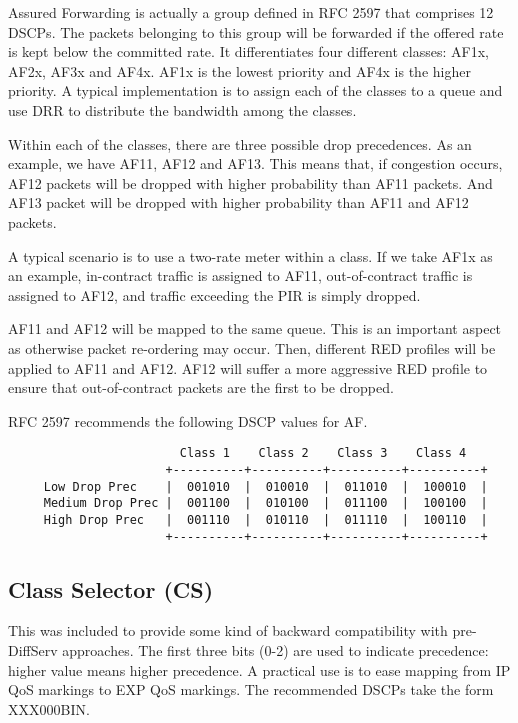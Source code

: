 Assured Forwarding is actually a group defined in RFC 2597 \cite{rfc2597} that comprises 12 DSCPs.
The packets belonging to this group will be forwarded if the offered rate is kept below the committed rate.
It differentiates four different classes: AF1x, AF2x, AF3x and AF4x.
AF1x is the lowest priority and AF4x is the higher priority.
A typical implementation is to assign each of the classes to a queue and use DRR to distribute the bandwidth among the classes.

Within each of the classes, there are three possible drop precedences.
As an example, we have AF11, AF12 and AF13.
This means that, if congestion occurs, AF12 packets will be dropped with higher probability than AF11 packets.
And AF13 packet will be dropped with higher probability than AF11 and AF12 packets.

A typical scenario is to use a two-rate meter within a class.
If we take AF1x as an example, in-contract traffic is assigned to AF11, out-of-contract traffic is assigned to AF12, and traffic exceeding the PIR is simply dropped.

AF11 and AF12 will be mapped to the same queue.
This is an important aspect as otherwise packet re-ordering may occur.
Then, different RED profiles will be applied to AF11 and AF12.
AF12 will suffer a more aggressive RED profile to ensure that out-of-contract packets are the first to be dropped.

RFC 2597 \cite{rfc2597} recommends the following DSCP values for AF.

{\scriptsize 
\begin{verbatim}
                        Class 1    Class 2    Class 3    Class 4
                      +----------+----------+----------+----------+
     Low Drop Prec    |  001010  |  010010  |  011010  |  100010  |
     Medium Drop Prec |  001100  |  010100  |  011100  |  100100  |
     High Drop Prec   |  001110  |  010110  |  011110  |  100110  |
                      +----------+----------+----------+----------+
\end{verbatim}
}

\subsection{Class Selector (CS)}
This was included to provide some kind of backward compatibility with pre-DiffServ approaches.
The first three bits (0-2) are used to indicate precedence: higher value means higher precedence.
A practical use is to ease mapping from IP QoS markings to EXP QoS markings.
The recommended DSCPs take the form XXX000BIN.

